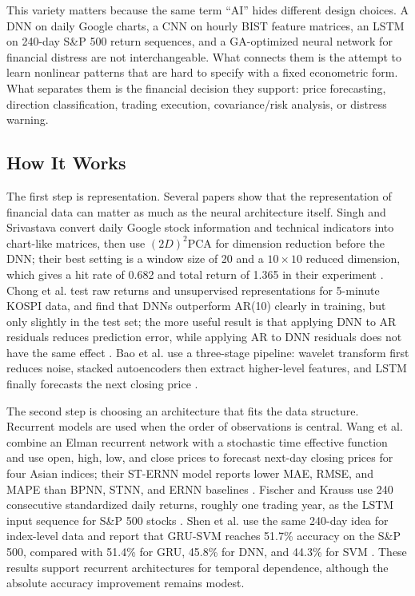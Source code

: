 \documentclass[conference]{IEEEtran}
\begin{document}
This variety matters because the same term ``AI'' hides different design choices. A DNN on daily Google charts, a CNN on hourly BIST feature matrices, an LSTM on 240-day S\&P 500 return sequences, and a GA-optimized neural network for financial distress are not interchangeable. What connects them is the attempt to learn nonlinear patterns that are hard to specify with a fixed econometric form. What separates them is the financial decision they support: price forecasting, direction classification, trading execution, covariance/risk analysis, or distress warning.

\subsection{How It Works}
The first step is representation. Several papers show that the representation of financial data can matter as much as the neural architecture itself. Singh and Srivastava convert daily Google stock information and technical indicators into chart-like matrices, then use $(2D)^2$PCA for dimension reduction before the DNN; their best setting is a window size of 20 and a $10 \times 10$ reduced dimension, which gives a hit rate of 0.682 and total return of 1.365 in their experiment \cite{singh2017stock}. Chong et al. test raw returns and unsupervised representations for 5-minute KOSPI data, and find that DNNs outperform AR(10) clearly in training, but only slightly in the test set; the more useful result is that applying DNN to AR residuals reduces prediction error, while applying AR to DNN residuals does not have the same effect \cite{chong2017deep}. Bao et al. use a three-stage pipeline: wavelet transform first reduces noise, stacked autoencoders then extract higher-level features, and LSTM finally forecasts the next closing price \cite{bao2017deep}.

The second step is choosing an architecture that fits the data structure. Recurrent models are used when the order of observations is central. Wang et al. combine an Elman recurrent network with a stochastic time effective function and use open, high, low, and close prices to forecast next-day closing prices for four Asian indices; their ST-ERNN model reports lower MAE, RMSE, and MAPE than BPNN, STNN, and ERNN baselines \cite{wang2016elman}. Fischer and Krauss use 240 consecutive standardized daily returns, roughly one trading year, as the LSTM input sequence for S\&P 500 stocks \cite{fischer2018deep}. Shen et al. use the same 240-day idea for index-level data and report that GRU-SVM reaches 51.7\% accuracy on the S\&P 500, compared with 51.4\% for GRU, 45.8\% for DNN, and 44.3\% for SVM \cite{shen2018gru}. These results support recurrent architectures for temporal dependence, although the absolute accuracy improvement remains modest.
\end{document}
